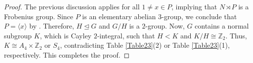 \documentclass{amsart}
\def \geq {\geqslant}
\begin{document}
\begin{proof}
	The previous discussion applies for all \( 1 \neq x \in P \), implying that \( N \rtimes P \) is a Frobenius group. Since \( P \) is an elementary abelian \( 3 \)-group, we conclude that \( P = \langle x \rangle \) by \cite[Corollary 6.17]{Issacs}. Therefore, \( H \unlhd G \) and \( G/H \) is a \( 2 \)-group. Now, \( G \) contains a normal subgroup \( K \), which is Cayley \( 2 \)-integral, such that \( H < K \) and \( K/H \cong \mathbb{Z}_2 \). Thus, \( K \cong A_4 \times \mathbb{Z}_2 \) or \( S_4 \), contradicting Table \ref{Table23}(2) or Table \ref{Table23}(1), respectively. This completes the proof.\end{proof}
	
	
	
	
	
	
	
	
	
	
\end{document}
